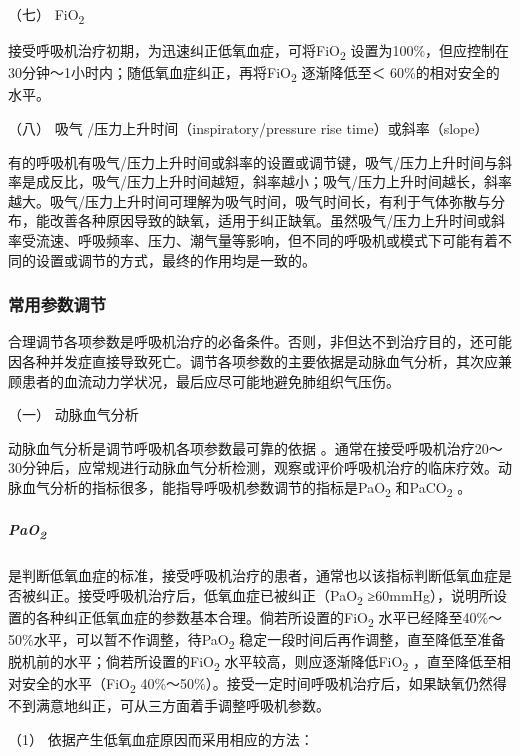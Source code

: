 \hypertarget{text00370.htmlux5cux23CHP16-3-4-1-7}{}
（七） FiO\textsubscript{2}

接受呼吸机治疗初期，为迅速纠正低氧血症，可将FiO\textsubscript{2}
设置为100\%，但应控制在30分钟～1小时内；随低氧血症纠正，再将FiO\textsubscript{2}
逐渐降低至＜ 60\%的相对安全的水平。

\hypertarget{text00370.htmlux5cux23CHP16-3-4-1-8}{}
（八） 吸气 /压力上升时间（inspiratory/pressure rise
time）或斜率（slope）

有的呼吸机有吸气/压力上升时间或斜率的设置或调节键，吸气/压力上升时间与斜率是成反比，吸气/压力上升时间越短，斜率越小；吸气/压力上升时间越长，斜率越大。吸气/压力上升时间可理解为吸气时间，吸气时间长，有利于气体弥散与分布，能改善各种原因导致的缺氧，适用于纠正缺氧。虽然吸气/压力上升时间或斜率受流速、呼吸频率、压力、潮气量等影响，但不同的呼吸机或模式下可能有着不同的设置或调节的方式，最终的作用均是一致的。

\subsubsection{常用参数调节}

合理调节各项参数是呼吸机治疗的必备条件。否则，非但达不到治疗目的，还可能因各种并发症直接导致死亡。调节各项参数的主要依据是动脉血气分析，其次应兼顾患者的血流动力学状况，最后应尽可能地避免肺组织气压伤。

\hypertarget{text00370.htmlux5cux23CHP16-3-4-2-1}{}
（一） 动脉血气分析

动脉血气分析是调节呼吸机各项参数最可靠的依据
。通常在接受呼吸机治疗20～30分钟后，应常规进行动脉血气分析检测，观察或评价呼吸机治疗的临床疗效。动脉血气分析的指标很多，能指导呼吸机参数调节的指标是PaO\textsubscript{2}
和PaCO\textsubscript{2} 。

\subparagraph{PaO\textsubscript{2}}

是判断低氧血症的标准，接受呼吸机治疗的患者，通常也以该指标判断低氧血症是否被纠正。接受呼吸机治疗后，低氧血症已被纠正（PaO\textsubscript{2}
≥60mmHg），说明所设置的各种纠正低氧血症的参数基本合理。倘若所设置的FiO\textsubscript{2}
水平已经降至40\%～50\%水平，可以暂不作调整，待PaO\textsubscript{2}
稳定一段时间后再作调整，直至降低至准备脱机前的水平；倘若所设置的FiO\textsubscript{2}
水平较高，则应逐渐降低FiO\textsubscript{2}
，直至降低至相对安全的水平（FiO\textsubscript{2}
40\%～50\%）。接受一定时间呼吸机治疗后，如果缺氧仍然得不到满意地纠正，可从三方面着手调整呼吸机参数。

\hypertarget{text00370.htmlux5cux23CHP16-3-4-2-1-1-1}{}
（1） 依据产生低氧血症原因而采用相应的方法：

